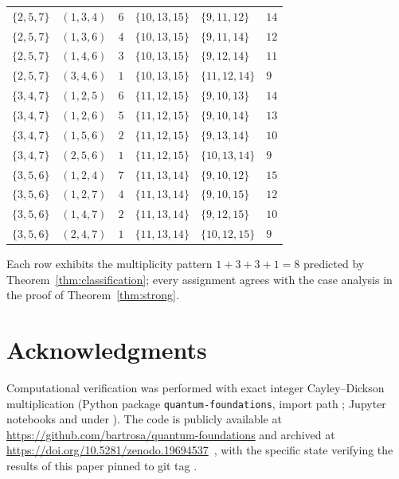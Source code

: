 \documentclass[12pt,a4paper]{article}
\begin{document}
\begin{table}[htbp]
\begin{tabular}{l|l|l|l|l|l}
\hline
$\{2,5,7\}$ & $(1,3,4)$ & $6$ & $\{10,13,15\}$ & $\{9,11,12\}$ & $14$ \\
$\{2,5,7\}$ & $(1,3,6)$ & $4$ & $\{10,13,15\}$ & $\{9,11,14\}$ & $12$ \\
$\{2,5,7\}$ & $(1,4,6)$ & $3$ & $\{10,13,15\}$ & $\{9,12,14\}$ & $11$ \\
$\{2,5,7\}$ & $(3,4,6)$ & $1$ & $\{10,13,15\}$ & $\{11,12,14\}$ & $9$ \\
\hline
$\{3,4,7\}$ & $(1,2,5)$ & $6$ & $\{11,12,15\}$ & $\{9,10,13\}$ & $14$ \\
$\{3,4,7\}$ & $(1,2,6)$ & $5$ & $\{11,12,15\}$ & $\{9,10,14\}$ & $13$ \\
$\{3,4,7\}$ & $(1,5,6)$ & $2$ & $\{11,12,15\}$ & $\{9,13,14\}$ & $10$ \\
$\{3,4,7\}$ & $(2,5,6)$ & $1$ & $\{11,12,15\}$ & $\{10,13,14\}$ & $9$ \\
\hline
$\{3,5,6\}$ & $(1,2,4)$ & $7$ & $\{11,13,14\}$ & $\{9,10,12\}$ & $15$ \\
$\{3,5,6\}$ & $(1,2,7)$ & $4$ & $\{11,13,14\}$ & $\{9,10,15\}$ & $12$ \\
$\{3,5,6\}$ & $(1,4,7)$ & $2$ & $\{11,13,14\}$ & $\{9,12,15\}$ & $10$ \\
$\{3,5,6\}$ & $(2,4,7)$ & $1$ & $\{11,13,14\}$ & $\{10,12,15\}$ & $9$ \\
\hline
\end{tabular}
\end{table}

Each row exhibits the multiplicity pattern $1 + 3 + 3 + 1 = 8$ predicted by Theorem~\ref{thm:classification}; every assignment agrees with the case analysis in the proof of Theorem~\ref{thm:strong}.

\clearpage
\section*{Acknowledgments}

\begin{sloppypar}
Computational verification was performed with exact integer Cayley--Dickson multiplication (Python package \texttt{quantum-foundations}, import path ; Jupyter notebooks and  under ).
The code is publicly available at \url{https://github.com/bartrosa/quantum-foundations} and archived at \url{https://doi.org/10.5281/zenodo.19694537}~\cite{rosa2026code}, with the specific state verifying the results of this paper pinned to git tag .
\end{sloppypar}

\clearpage


\end{document}
